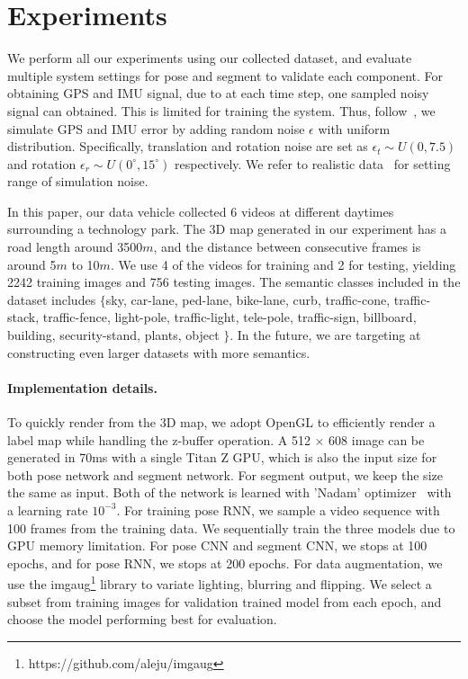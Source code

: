 \section{Experiments}
\label{sec:experiments}
We perform all our experiments using our collected dataset, and evaluate multiple system settings for pose and segment to validate each component.
For obtaining GPS and IMU signal, due to at each time step, one sampled noisy signal can obtained. This is limited for training the system. Thus, follow~\cite{vishal2015accurate}, we simulate GPS and IMU error by adding random noise $\epsilon$ with uniform distribution. Specifically, translation and rotation noise are set as $\epsilon_t \sim U(0, 7.5)$ and rotation $\epsilon_r \sim U(0^{\circ}, 15^{\circ})$ respectively. We refer to realistic data~\cite{lee2015gps} for setting range of simulation noise.

In this paper, our data vehicle collected 6 videos at different daytimes surrounding a technology park. The 3D map generated in our experiment has a road length around 3500$m$, and the distance between consecutive frames is around 5$m$ to 10$m$. We use 4 of the videos for training and 2 for testing, yielding 2242 training images and 756 testing images. The semantic classes included in the dataset includes $\{$sky, car-lane, ped-lane, bike-lane, curb, traffic-cone, traffic-stack, traffic-fence, light-pole, traffic-light, tele-pole, traffic-sign, billboard, building, security-stand, plants, object $\}$. In the future, we are targeting at constructing even larger datasets with more semantics.

\paragraph{Implementation details.} To quickly render from the 3D map, we adopt OpenGL to efficiently render a label map while handling the z-buffer operation. A 512 $\times$ 608 image can be generated in 70ms with a single Titan Z GPU, which is also the input size for both pose network and segment network. For segment output, we keep the size the same as input. Both of the network is learned with 'Nadam' optimizer~\cite{dozat2016incorporating} with a learning rate $10^{-3}$. For training pose RNN, we sample a video sequence with 100 frames from the training data. We sequentially train the three models due to GPU memory limitation.
For pose CNN and segment CNN, we stops at 100 epochs, and for pose RNN, we stops at 200 epochs. For data augmentation, we use the imgaug\footnote{https://github.com/aleju/imgaug} library to variate lighting, blurring and flipping. We select a subset from training images for validation trained model from each epoch, and choose the model performing best for evaluation.

